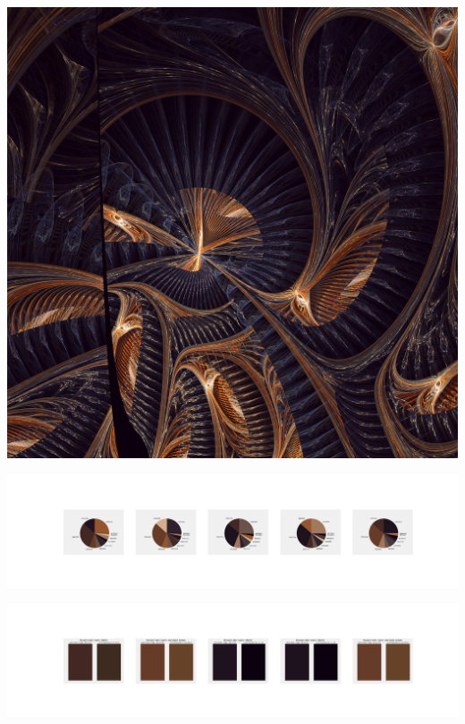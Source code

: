\documentclass[11pt]{article}
\begin{document}
\begin{landscape}
    \begin{center}
    \includegraphics[width=\textwidth]{./nbimg/file (215).jpg}
    \end{center}

    \begin{center}
    \includegraphics[width=250mm]{./nbimg/pie-129.jpg}
    \end{center}

    \begin{center}
    \includegraphics[width=250mm]{./nbimg/peak-129.jpg}
    \end{center}
    


\end{landscape}
\end{document}
